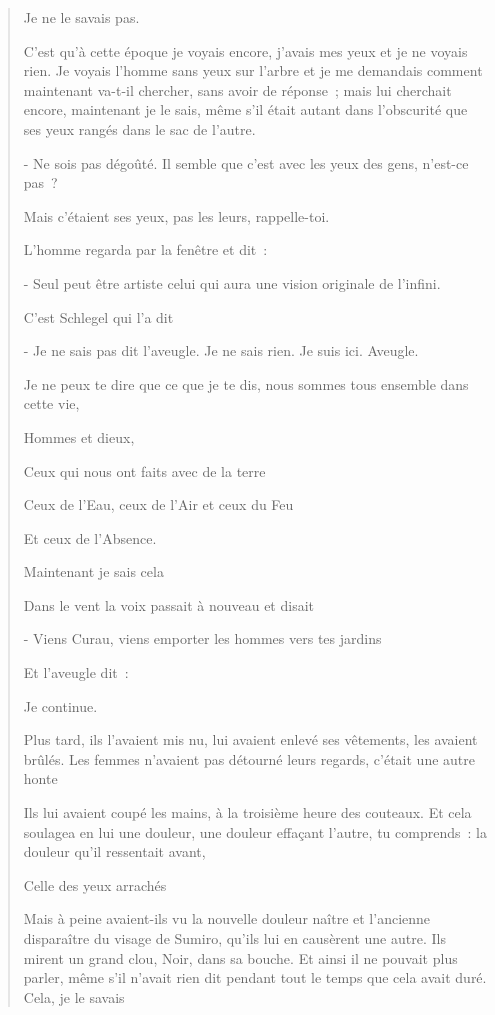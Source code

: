 \begin{quote}
Je ne le savais pas.

C'est qu'à cette époque je voyais encore, j'avais mes yeux et je ne
voyais rien. Je voyais l'homme sans yeux sur l'arbre et je me demandais
comment maintenant va-t-il chercher, sans avoir de réponse~; mais lui
cherchait encore, maintenant je le sais, même s'il était autant dans
l'obscurité que ses yeux rangés dans le sac de l'autre.

- Ne sois pas dégoûté. Il semble que c'est avec les yeux des gens,
n'est-ce pas~?

Mais c'étaient ses yeux, pas les leurs, rappelle-toi.

L'homme regarda par la fenêtre et dit~:

- Seul peut être artiste celui qui aura une vision originale de
l'infini.

C'est Schlegel qui l'a dit

- Je ne sais pas dit l'aveugle. Je ne sais rien. Je suis ici. Aveugle.

Je ne peux te dire que ce que je te dis, nous sommes tous ensemble dans
cette vie,

Hommes et dieux,

Ceux qui nous ont faits avec de la terre

Ceux de l'Eau, ceux de l'Air et ceux du Feu

Et ceux de l'Absence.

Maintenant je sais cela

Dans le vent la voix passait à nouveau et disait

- Viens Curau, viens emporter les hommes vers tes jardins

Et l'aveugle dit~:

Je continue.

Plus tard, ils l'avaient mis nu, lui avaient enlevé ses vêtements, les
avaient brûlés. Les femmes n'avaient pas détourné leurs regards, c'était
une autre honte

Ils lui avaient coupé les mains, à la troisième heure des couteaux. Et
cela soulagea en lui une douleur, une douleur effaçant l'autre, tu
comprends~: la douleur qu'il ressentait avant,

Celle des yeux arrachés

Mais à peine avaient-ils vu la nouvelle douleur naître et l'ancienne
disparaître du visage de Sumiro, qu'ils lui en causèrent une autre. Ils
mirent un grand clou, Noir, dans sa bouche. Et ainsi il ne pouvait plus
parler, même s'il n'avait rien dit pendant tout le temps que cela avait
duré. Cela, je le savais


\end{quote}
